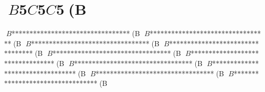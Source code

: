 \documentclass{jbook}
\begin{document}
{{\section{$B$5$C$5$C$5(B}
$B$*$*$*$*$*$*$*$*$*$*$*$*$*$*$*$*$*$*$*$*$*$*$*$*$*$*$*$*$*$*$*$*$*(B
$B$*$*$*$*$*$*$*$*$*$*$*$*$*$*$*$*$*$*$*$*$*$*$*$*$*$*$*$*$*$*$*$*$*(B
$B$*$*$*$*$*$*$*$*$*$*$*$*$*$*$*$*$*$*$*$*$*$*$*$*$*$*$*$*$*$*$*$*$*(B
$B$*$*$*$*$*$*$*$*$*$*$*$*$*$*$*$*$*$*$*$*$*$*$*$*$*$*$*$*$*$*$*$*$*(B
$B$*$*$*$*$*$*$*$*$*$*$*$*$*$*$*$*$*$*$*$*$*$*$*$*$*$*$*$*$*$*$*$*$*(B
$B$*$*$*$*$*$*$*$*$*$*$*$*$*$*$*$*$*$*$*$*$*$*$*$*$*$*$*$*$*$*$*$*$*(B
$B$*$*$*$*$*$*$*$*$*$*$*$*$*$*$*$*$*$*$*$*$*$*$*$*$*$*$*$*$*$*$*$*$*(B
$B$*$*$*$*$*$*$*$*$*$*$*$*$*$*$*$*$*$*$*$*$*$*$*$*$*$*$*$*$*$*$*$*$*(B
$B$*$*$*$*$*$*$*$*$*$*$*$*$*$*$*$*$*$*$*$*$*$*$*$*$*$*$*$*$*$*$*$*$*(B
$B$*$*$*$*$*$*$*$*$*$*$*$*$*$*$*$*$*$*$*$*$*$*$*$*$*$*$*$*$*$*$*$*$*(B

}}
\end{document}
